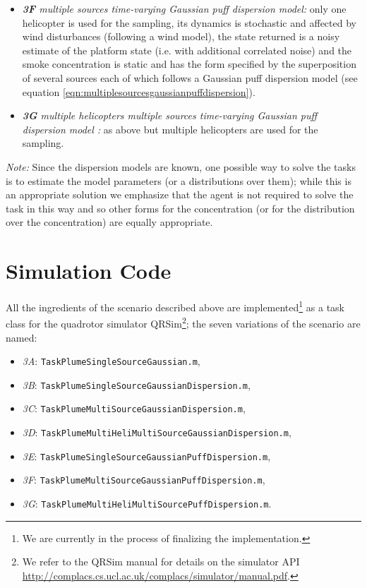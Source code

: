 \documentclass[a4paper,11pt]{report}
\newcommand{\sname}{QRSim\xspace}
\newcommand{\webman}{\url{http://complacs.cs.ucl.ac.uk/complacs/simulator/manual.pdf}\xspace}
\newcommand\mytexttt[1]{\texttt{\hyphenchar\font=45\relax #1}}
\begin{document}
\begin{itemize}
\item \textit{\textbf{3F} multiple sources time-varying Gaussian puff dispersion model:} only one helicopter is used for the sampling, its dynamics is stochastic and affected by wind disturbances (following a wind model), the state returned is a noisy estimate of the platform state (i.e. with additional correlated noise) and the smoke concentration is static and has the form specified by the superposition of several sources each of which follows a Gaussian puff dispersion model (see equation \ref{eqn:multiplesourcesgaussianpuffdispersion}).

\item \textit{\textbf{3G} multiple helicopters multiple sources time-varying Gaussian puff dispersion model :} as above but multiple helicopters are used for the sampling.

\end{itemize}

\textit{Note:}
Since the dispersion models are known, one possible way to solve the tasks is to estimate the model parameters (or a distributions over them); while this is an appropriate solution we emphasize that the agent is not required to solve the task in this way and so other forms for the concentration (or for the distribution over the concentration) are equally appropriate.  

\section{Simulation Code} \label{PlumeSim}

All the ingredients of the scenario described above are implemented\footnote{We are currently in the process of finalizing the implementation.} as a task class for the quadrotor simulator \sname\footnote{We refer to the \sname manual for details on the simulator API \webman.}; the seven variations of the scenario are named:
\begin{itemize}
\item\textit{3A}: \mytexttt{TaskPlumeSingleSourceGaussian.m}, 
\item\textit{3B}: \mytexttt{TaskPlumeSingleSourceGaussianDispersion.m},
\item\textit{3C}: \mytexttt{TaskPlumeMultiSourceGaussianDispersion.m}, 
\item\textit{3D}: \mytexttt{TaskPlumeMultiHeliMultiSourceGaussianDispersion.m}, 
\item\textit{3E}: \mytexttt{TaskPlumeSingleSourceGaussianPuffDispersion.m}, 
\item\textit{3F}: \mytexttt{TaskPlumeMultiSourceGaussianPuffDispersion.m},
\item\textit{3G}: \mytexttt{TaskPlumeMultiHeliMultiSourcePuffDispersion.m}. 
\end{itemize}
\end{document}
